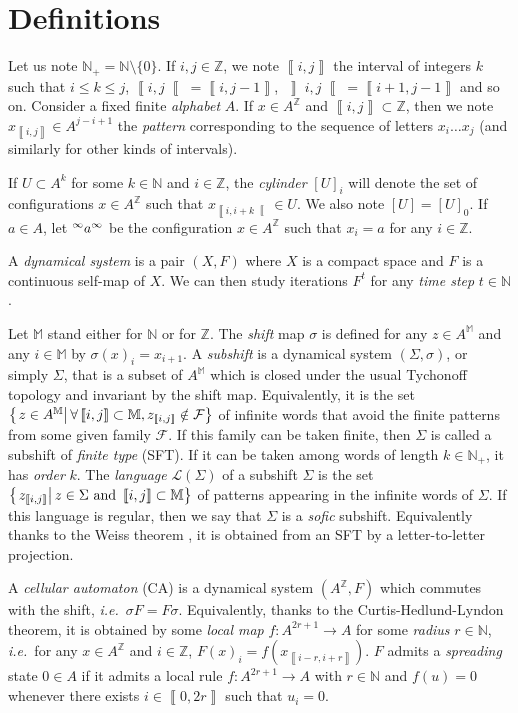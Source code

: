 \documentclass{jac}
\let\dfn\emph
\newcommand{\Z}{\mathbb Z}
\newcommand{\N}{\mathbb N}
\newcommand{\M}{\mathbb M}
\newcommand{\Ns}{\N_+}
\newcommand{\az}{{A^\Z}}
\newcommand{\sett}[2]{\left\{\left.#1\vphantom{#2}\right|#2\right\}}
\newcommand{\set}[3]{\sett{#1\in#2}{#3}}
\newcommand{\oo}[2]{\left\rrbracket #1,#2\right\llbracket}
\newcommand{\cc}[2]{\left\llbracket #1,#2\right\rrbracket}
\newcommand{\scc}[2]{_{\cc{#1}{#2}}}\newcommand{\soo}[2]{_{\oo{#1}{#2}}}\newcommand{\co}[2]{\left\llbracket #1,#2\right\llbracket}\newcommand{\sco}[2]{_{\co{#1}{#2}}}\newcommand{\kaprx}[1]{\mathcal A_{#1}}
\newcommand{\dinf}[1]{\vphantom{#1}^\infty{#1}^\infty}
\newcommand{\lang}{\mathcal L}
\newcommand{\ie}{\textit{i.e.}\ }
\theoremstyle{definition}
\begin{document}
\section{Definitions}

Let us note $\Ns=\N\setminus\{0\}$. If $i,j\in\Z$, we note $\cc ij$ the interval of integers $k$ such that $i\le k\le j$, $\co ij=\cc i{j-1}$, $\oo ij=\cc{i+1}{j-1}$ and so on.
Consider a fixed finite \dfn{alphabet} $A$.
If $x\in A^\Z$ and $\cc ij\subset\Z$, then we note $x\scc ij\in A^{j-i+1}$ the \dfn{pattern} corresponding to the sequence of letters $x_i\ldots x_j$ (and similarly for other kinds of intervals).

If $U\subset A^k$ for some $k\in\N$ and $i\in\Z$, the \dfn{cylinder} $[U]_i$ will denote the set of configurations $x\in A^\Z$ such that $x\sco i{i+k}\in U$. We also note $[U]=[U]_0$.
If $a\in A$, let $\dinf a$ be the configuration $x\in\az$ such that $x_i=a$ for any $i\in\Z$.

A \dfn{dynamical system} is a pair $(X,F)$ where $X$ is a compact space and $F$ is a continuous self-map of $X$. We can then study iterations $F^t$ for any \dfn{time step} $t\in\N$.

Let $\M$ stand either for $\N$ or for $\Z$. The \dfn{shift} map $\sigma$ is defined for any $z\in A^\M$ and any $i\in\M$ by $\sigma(x)_i=x_{i+1}$.
A \dfn{subshift} is a dynamical system $(\Sigma,\sigma)$, or simply $\Sigma$, that is a subset of $A^\M$ which is closed under the usual Tychonoff topology and invariant by the shift map.
Equivalently, it is the set $\set z{A^\M}{\forall\cc ij\subset\M,z\scc ij\notin\mathcal F}$ of infinite words that avoid the finite patterns from some given family $\mathcal F$.
If this family can be taken finite, then $\Sigma$ is called a subshift of \dfn{finite type} (SFT). If it can be taken among words of length $k\in\Ns$, it has \dfn{order} $k$.
The \dfn{language} $\lang(\Sigma)$ of a subshift $\Sigma$ is the set $\sett{z\scc ij}{z\in\Sigma\text{ and }\cc ij\subset\M}$ of patterns appearing in the infinite words of $\Sigma$.
If this language is regular, then we say that $\Sigma$ is a \dfn{sofic} subshift. Equivalently thanks to the Weiss theorem \cite{weiss}, it is obtained from an SFT by a letter-to-letter projection.

A \dfn{cellular automaton} (CA) is a dynamical system $(\az,F)$ which commutes with the shift, \ie $\sigma F=F\sigma$.
Equivalently, thanks to the Curtis-Hedlund-Lyndon theorem, it is obtained by some \dfn{local map} $f:A^{2r+1}\to A$ for some \dfn{radius} $r\in\N$, \ie for any $x\in\az$ and $i\in\Z$, $F(x)_i=f(x\scc{i-r}{i+r})$.
$F$ admits a \dfn{spreading} state $0\in A$ if it admits a local rule $f:A^{2r+1}\to A$ with $r\in\N$ and $f(u)=0$ whenever there exists $i\in\cc0{2r}$ such that $u_i=0$.
\end{document}
